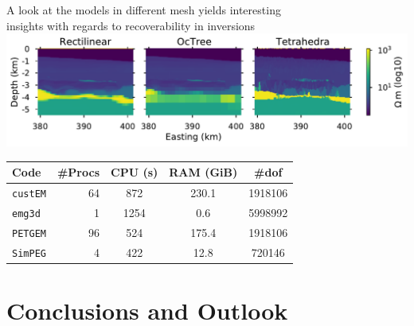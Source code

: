 \documentclass[xcolor=svgnames, aspectratio=169]{beamer}
\newcommand{\emg}[2]{\texttt{emg#1#2}\xspace}
\newcommand{\simpeg}{\texttt{SimPEG}\xspace}
\newcommand{\custem}{\texttt{custEM}\xspace}
\newcommand{\petgem}{\texttt{PETGEM}\xspace}
\begin{document}
\begin{frame}
  {A look at the models in different mesh yields interesting\\
   insights with regards to recoverability in inversions}
  \centering
  \includegraphics[width=\textwidth]{results-marlim_allmodels}
    \begin{table}
      \footnotesize %
      \begin{tabular}{lrS[table-format=6.0]S[table-format=4.1]S[table-format=8.0]}
        Code & \#Procs & {CPU (s)} & {RAM (GiB)}   & {\#dof} \\
        \midrule
        \custem & 64 &  872 & 230.1 & 1918106 \\
        \emg3d  &  1 & 1254 &   0.6 & 5998992 \\
        \petgem & 96 &  524 & 175.4 & 1918106 \\
        \simpeg &  4 &  422 &  12.8 &  720146 \\
      \end{tabular}
    \end{table}
\end{frame}

\section{Conclusions and Outlook} %
\end{document}
